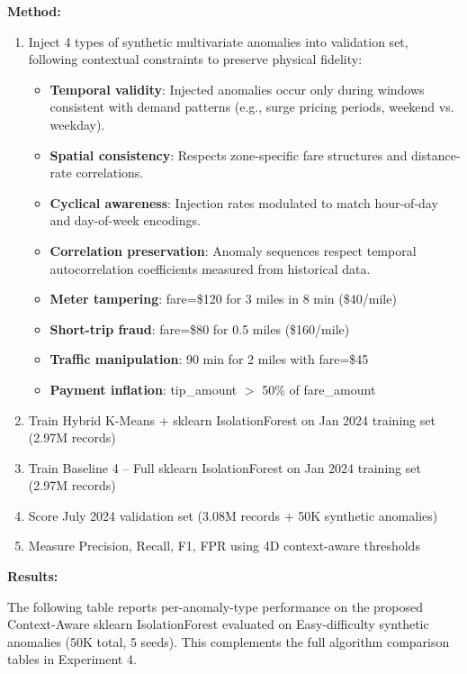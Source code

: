 \textbf{Method:}
\begin{enumerate}
    \item Inject 4 types of synthetic multivariate anomalies into validation set, following contextual constraints to preserve physical fidelity:
        \begin{itemize}
            \item \textbf{Temporal validity}: Injected anomalies occur only during windows consistent with demand patterns (e.g., surge pricing periods, weekend vs. weekday).
            \item \textbf{Spatial consistency}: Respects zone-specific fare structures and distance-rate correlations.
            \item \textbf{Cyclical awareness}: Injection rates modulated to match hour-of-day and day-of-week encodings.
            \item \textbf{Correlation preservation}: Anomaly sequences respect temporal autocorrelation coefficients measured from historical data.
            \item \textbf{Meter tampering}: fare=\$120 for 3 miles in 8 min (\$40/mile)
            \item \textbf{Short-trip fraud}: fare=\$80 for 0.5 miles (\$160/mile)
            \item \textbf{Traffic manipulation}: 90 min for 2 miles with fare=\$45
            \item \textbf{Payment inflation}: tip\_amount $>$ 50\% of fare\_amount
        \end{itemize}
    \item Train Hybrid K-Means + sklearn IsolationForest on Jan 2024 training set (2.97M records)

    \item Train Baseline 4 -- Full sklearn IsolationForest on Jan 2024 training set (2.97M records)
    \item Score July 2024 validation set (3.08M records + 50K synthetic anomalies)
    \item Measure Precision, Recall, F1, FPR using 4D context-aware thresholds
\end{enumerate}

\textbf{Results:}

The following table reports per-anomaly-type performance on the proposed Context-Aware sklearn IsolationForest evaluated on Easy-difficulty synthetic anomalies (50K total, 5 seeds). This complements the full algorithm comparison tables in Experiment 4.

